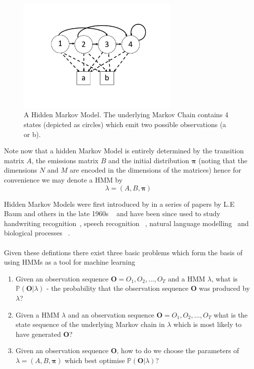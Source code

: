 \begin{figure}[]
  \centering
    \includegraphics[width=0.7\textwidth]{ThesisFigs/HMMExample}
  \caption{A Hidden Markov Model. The underlying Markov Chain contains 4 states (depicted as circles) which emit two possible observations (a or b).}\label{ref:hmmex}
\end{figure}


Note now that a hidden Markov Model is entirely determined by the transition matrix $A$, the emissions matrix $B$ and the initial distribution $\bm{\pi}$ (noting that the dimensions $N$ and $M$ are encoded in the dimensions of the matrices) hence for convenience we may denote a HMM by
\begin{equation*}
\lambda = (A,B, \bm{\pi})
\end{equation*}

Hidden Markov Models were first introduced by in a series of papers by L.E Baum and others in the late 1960s ~\citep{baum1966statistical,baum1970maximization} and have been since used to study handwriting recognition~\citep{bunke1995off}, speech recognition ~\citep{juang1991hidden, jelinek1998statistical}, natural language modelling~\citep{manning1999foundations, jurafsky2002speech} and biological processes ~\citep{krogh1994hidden, durbin1998biological, lio1998models}.
\\
\\
Given these defintions there exist three basic problems which form the basis of using HMMs as a tool for machine learning
\begin{enumerate}
\item Given an observation sequence $\bm{O} = O_1,O_2,\dots,O_T$ and a HMM $\lambda$, what is $\mathbb{P}(\bm{O}|\lambda)$ - the probability that the observation sequence $\bm{O}$ was produced by $\lambda$?
\item Given a HMM $\lambda$ and an observation sequence $\bm{O} = O_1,O_2,\dots,O_T $ what is the state sequence of the underlying Markov chain in $\lambda$ which is most likely to have generated $\bm{O}$?
\item Given an observation sequence $\bm{O}$, how to do we choose the parameters of $\lambda = (A,B,\bm{\pi})$ which best optimise $\mathbb{P}(\bm{O}|\lambda)$?
\end{enumerate}

